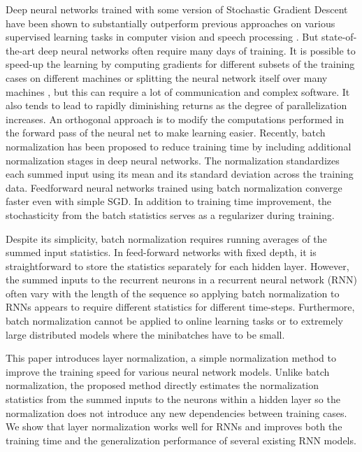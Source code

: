 \documentclass{article}
\begin{document}
Deep neural networks trained with some version of Stochastic Gradient Descent have been shown to substantially outperform previous approaches on various supervised learning tasks in computer vision \citep{krizhevsky2012imagenet} and speech processing \citep{hinton2012deep}. But state-of-the-art deep neural networks often require many days of training. It is possible to speed-up the learning by computing gradients for different subsets of the training cases on different machines or splitting the neural network itself over many machines \citep{dean2012large}, but this can require a lot of communication and complex software.  It also tends to lead to rapidly diminishing returns as the degree of parallelization increases. An orthogonal approach is to modify the computations performed in the forward pass of the neural net to make learning easier. Recently, batch normalization \citep{ioffe2015batch} has been proposed to reduce training time by including additional normalization stages in deep neural networks. The normalization standardizes each summed input using its mean and its standard deviation across the training data. Feedforward neural networks trained using batch normalization converge faster even with simple SGD. In addition to training time improvement, the stochasticity from the batch statistics serves as a regularizer during training. 

Despite its simplicity, batch normalization requires running averages of the summed input statistics. In feed-forward networks with fixed depth, it is straightforward to store the statistics separately for each hidden layer. However, the summed inputs to the recurrent neurons in a recurrent neural network (RNN) often vary with the length of the sequence so applying batch normalization to RNNs appears to require different statistics for different time-steps. Furthermore, batch normalization cannot be applied to online learning tasks or to extremely large distributed models where the minibatches have to be small. 

This paper introduces layer normalization, a simple normalization method to improve the training speed for various neural network models. Unlike batch normalization, the proposed method directly estimates the normalization statistics from the summed inputs to the neurons within a hidden layer so the normalization does not introduce any new dependencies between training cases. We show that layer normalization works well for RNNs and improves both the training time and the generalization performance of several existing RNN models. 
\end{document}
